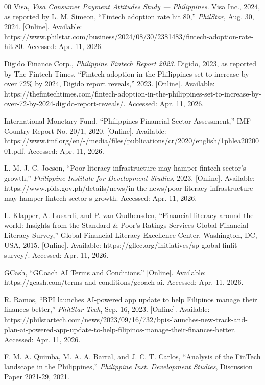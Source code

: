 \documentclass[journal]{./IEEE/IEEEtran}
\begin{document}
\begin{thebibliography}{00}
 Visa, \emph{Visa Consumer Payment Attitudes Study --- Philippines}. Visa Inc., 2024, as reported by L. M. Simeon, ``Fintech adoption rate hit 80,'' \emph{PhilStar}, Aug. 30, 2024. [Online]. Available: https://www.philstar.com/business/2024/08/30/2381483/fintech-adoption-rate-hit-80. Accessed: Apr. 11, 2026.

 Digido Finance Corp., \emph{Philippine Fintech Report 2023}. Digido, 2023, as reported by The Fintech Times, ``Fintech adoption in the Philippines set to increase by over 72\% by 2024, Digido report reveals,'' 2023. [Online]. Available: https://thefintechtimes.com/fintech-adoption-in-the-philippines-set-to-increase-by-over-72-by-2024-digido-report-reveals/. Accessed: Apr. 11, 2026.

 International Monetary Fund, ``Philippines Financial Sector Assessment,'' IMF Country Report No. 20/1, 2020. [Online]. Available: https://www.imf.org/en/-/media/files/publications/cr/2020/english/1phlea2020001.pdf. Accessed: Apr. 11, 2026.

 L. M. J. C. Jocson, ``Poor literacy infrastructure may hamper fintech sector's growth,'' \emph{Philippine Institute for Development Studies}, 2023. [Online]. Available: https://www.pids.gov.ph/details/news/in-the-news/poor-literacy-infrastructure-may-hamper-fintech-sector-s-growth. Accessed: Apr. 11, 2026.

 L. Klapper, A. Lusardi, and P. van Oudheusden, ``Financial literacy around the world: Insights from the Standard \& Poor's Ratings Services Global Financial Literacy Survey,'' Global Financial Literacy Excellence Center, Washington, DC, USA, 2015. [Online]. Available: https://gflec.org/initiatives/sp-global-finlit-survey/. Accessed: Apr. 11, 2026.

 GCash, ``GCoach AI Terms and Conditions.'' [Online]. Available: https://gcash.com/terms-and-conditions/gcoach-ai. Accessed: Apr. 11, 2026.

 R. Ramos, ``BPI launches AI-powered app update to help Filipinos manage their finances better,'' \emph{PhilStar Tech}, Sep. 16, 2023. [Online]. Available: https://philstartech.com/news/2023/09/16/732/bpis-launches-new-track-and-plan-ai-powered-app-update-to-help-filipinos-manage-their-finances-better. Accessed: Apr. 11, 2026.

 F. M. A. Quimba, M. A. A. Barral, and J. C. T. Carlos, ``Analysis of the FinTech landscape in the Philippines,'' \emph{Philippine Inst. Development Studies}, Discussion Paper 2021-29, 2021.


\end{thebibliography}
\end{document}
